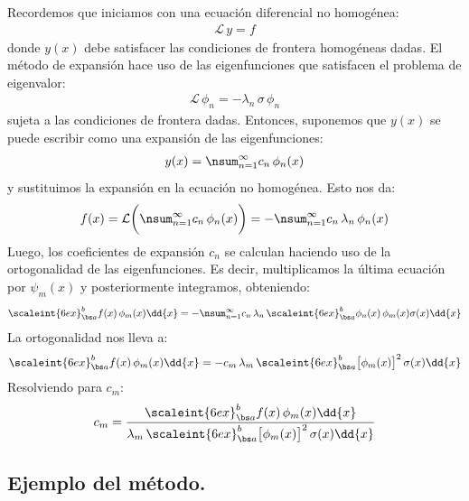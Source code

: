 Recordemos que iniciamos con una ecuación diferencial no homogénea:
\begin{align*}
\mathcal{L} \, y = f
\end{align*}
donde $y (x)$ debe satisfacer las condiciones de frontera homogéneas dadas. El método de expansión hace uso de las eigenfunciones que satisfacen el problema de eigenvalor:
\begin{align*}
\mathcal{L} \, \phi_{n} = - \lambda_{n} \, \sigma \, \phi_{n}
\end{align*}
sujeta a las condiciones de frontera dadas. Entonces, suponemos que $y (x)$ se puede escribir como una expansión de las eigenfunciones:
\begin{align*}
y (x) = \nsum_{n=1}^{\infty} c_{n} \, \phi_{n} (x)
\end{align*}
y sustituimos la expansión en la ecuación no homogénea. Esto nos da:
\begin{align*}
f (x) = \mathcal{L} \bigg( \nsum_{n=1}^{\infty} c_{n} \, \phi_{n} (x) \bigg) = - \nsum_{n=1}^{\infty} c_{n} \, \lambda_{n} \, \phi_{n} (x)
\end{align*}
Luego, los coeficientes de expansión $c_{n}$ se calculan haciendo uso de la ortogonalidad de las eigenfunciones. Es decir, multiplicamos la última ecuación por $\psi_{m} (x)$ y posteriormente integramos, obteniendo:
\begin{align*}
\scaleint{6ex}_{\bs a}^{b} f (x) \, \phi_{m} (x) \dd{x} = - \nsum_{n=1}^{\infty} c_{n} \, \lambda_{n} \, \scaleint{6ex}_{\bs a}^{b} \phi_{n} (x) \, \phi_{m} (x) \sigma (x) \dd{x}
\end{align*}
La ortogonalidad nos lleva a:
\begin{align*}
\scaleint{6ex}_{\bs a}^{b} f (x) \, \phi_{m} (x) \dd{x} = - c_{m} \, \lambda_{m} \, \scaleint{6ex}_{\bs a}^{b} \big[ \phi_{m} (x) \big]^{2} \, \sigma (x) \dd{x}
\end{align*}
Resolviendo para $c_{m}$:
\begin{align*}
c_{m} = \dfrac{\scaleint{6ex}_{\bs a}^{b} f (x) \, \phi_{m} (x) \dd{x}}{\lambda_{m} \, \scaleint{6ex}_{\bs a}^{b} \big[ \phi_{m} (x) \big]^{2} \, \sigma (x) \dd{x}}
\end{align*}

\subsection{Ejemplo del método.}

